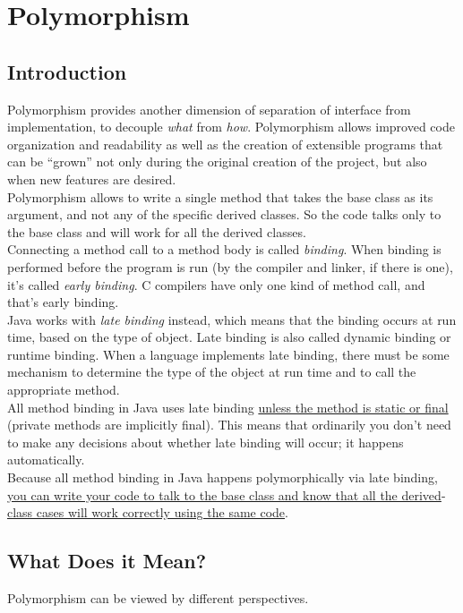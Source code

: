 \documentclass[10pt,letterpaper]{report}
\begin{document}
\chapter{Polymorphism}
\section{Introduction}
Polymorphism provides another dimension of separation of interface from implementation, to decouple \textit{what} from \textit{how}. Polymorphism allows improved code organization and readability as well as the creation of extensible programs that can be ``grown'' not only during the original creation of the project, but also when new features are desired.\\

Polymorphism allows to write a single method that takes the base class as its argument, and not any of the specific derived classes. So the code talks only to the base class and will work for all the derived classes.\\

Connecting a method call to a method body is called \textit{binding}. When binding is performed before the program is run (by the compiler and linker, if there is one), it's called \textit{early binding}. C compilers have only one kind of method call, and that's early binding.\\

Java works with \textit{late binding} instead, which means that the binding occurs at run time, based on the type of object. Late binding is also called dynamic binding or runtime binding. When a language implements late binding, there must be some mechanism to determine the type of the object at run time and to call the appropriate method.\\

All method binding in Java uses late binding \underline{unless the method is static or final} (private methods are implicitly final). This means that ordinarily you don't need to make any decisions about whether late binding will occur; it happens automatically.\\

Because all method binding in Java happens polymorphically via late binding, \underline{you can write your code to talk to the base class and know that all the derived}-\underline{class cases will work correctly using the same code}.
\section{What Does it Mean?}
Polymorphism can be viewed by different perspectives.
\end{document}
